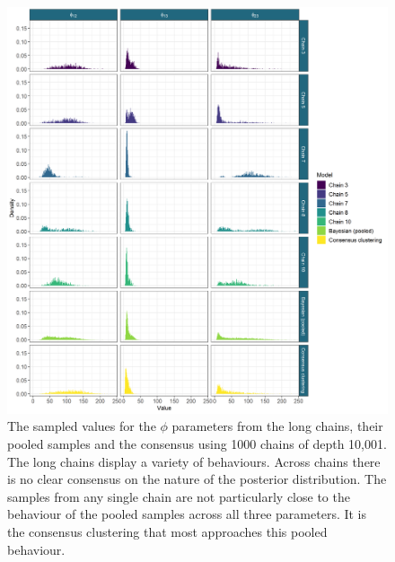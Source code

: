 \documentclass{bmcart}
\begin{document}
\begin{figure}
	\centering
	\includegraphics[scale=0.45]{./Images/Yeast/ComparisonDensitiesNoTitle.png}
	\caption{The sampled values for the $\phi$ parameters from the long chains, their pooled samples and the consensus using 1000 chains of depth 10,001. The long chains display a variety of behaviours. Across chains there is no clear consensus on the nature of the posterior distribution. The samples from any single chain are not particularly close to the behaviour of the pooled samples across all three parameters. It is the consensus clustering that most approaches this pooled behaviour.}
	\label{fig:densityComparison}
\end{figure}

\end{document}
